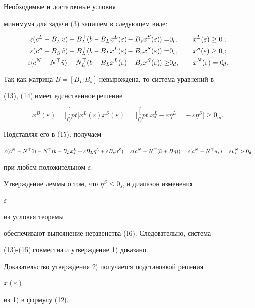 \begin{pf} Необходимые и достаточные условия


минимума для задачи (3) запишем в следующем виде:


\begin{alignat}{2}


\varepsilon(c^L-B^\top_L\Tilde u)-B^\top_L(b-B_Lx^L(\varepsilon)-


B_sx^S(\varepsilon))=& 0_l,\ &\quad &x^L(\varepsilon)\ge 0_l;\\


\varepsilon(c^S-B^\top_S\Tilde u)-B^\top_L(b-B_Lx^L(\varepsilon)-


B_sx^S(\varepsilon))=& 0_s, &\quad & x^S(\varepsilon)\ge 0_s;\\


\varepsilon(c^N-N^\top\Tilde u)-N^\top_L(b-B_Lx^L(\varepsilon)-


B_sx^S(\varepsilon))\ge & 0_d, &\quad & x^N(\varepsilon)=0_d.


\end{alignat}


Так как матрица $B=[B_L\vdots B_s]$ невырождена, то система уравнений в


(13), (14) имеет единственное решение


\begin{equation}


x^B(\varepsilon)=


\biggl[\frac[0pt]{x^L(\varepsilon)}{x^S(\varepsilon)}\biggr]=


\biggl[\frac[0pt]{x^L_*-\varepsilon\eta^L}


{{\phantom{x^L_*}}-\varepsilon\eta^S}\biggr]


\ge 0_m.


\end{equation}


Подставляя его в (15), получаем


$\varepsilon(c^N-N^\top\Tilde u)-N^\top(b-B_Lx^L_*+\varepsilon


B_L\eta^L+\varepsilon B_s\eta^S)=\varepsilon(c^N-N^\top(\Tilde u+


B\eta))=\varepsilon(c^N-N^\top u_*)=\varepsilon v^N_*>0_d$


при любом положительном $\varepsilon$.





Утверждение леммы о том, что $\eta^S\le 0_s$, и диапазон изменения


$\varepsilon$


из условия теоремы


обеспечивают выполнение неравенства (16). Следовательно, система


(13)-(15) совместна и утверждение 1) доказано.





Доказательство утверждения 2) получается подстановкой решения


$x(\varepsilon)$


из 1) в формулу (12).


\end{pf}





